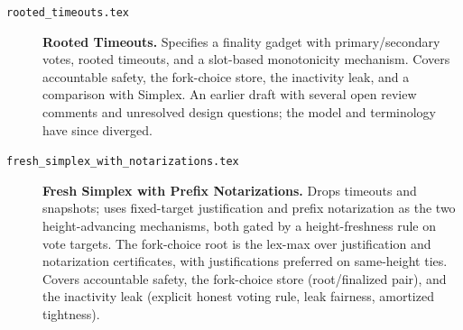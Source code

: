 \documentclass{article}
\begin{document}
\begin{description}
\item[\texttt{rooted\_timeouts.tex}] \textbf{Rooted Timeouts.}
  Specifies a finality gadget with primary/secondary votes, rooted timeouts,
  and a slot-based monotonicity mechanism.
  Covers accountable safety, the fork-choice store,
  the inactivity leak, and a comparison with Simplex.
  An earlier draft with several open review comments and unresolved
  design questions; the model and terminology have since diverged.

\item[\texttt{fresh\_simplex\_with\_notarizations.tex}]
  \textbf{Fresh Simplex with Prefix Notarizations.}
  Drops timeouts and snapshots; uses fixed-target justification and
  prefix notarization as the two height-advancing mechanisms, both
  gated by a height-freshness rule on vote targets.
  The fork-choice root is the lex-max over justification and notarization
  certificates, with justifications preferred on same-height ties.
  Covers accountable safety, the fork-choice store (root/finalized pair),
  and the inactivity leak (explicit honest voting rule, leak fairness,
  amortized tightness).

\end{description}
\end{document}
